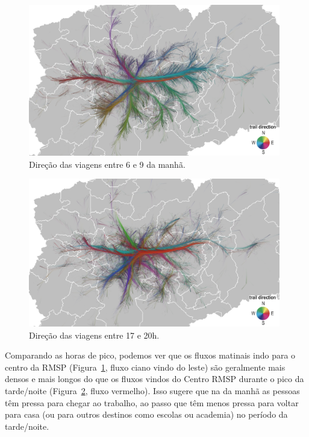 \begin{figure}[!htb]
  \centering
  \captionsetup{justification=centering}
  \includegraphics[width=0.98\textwidth]{../figuras/peak-hours-6h-to-9h-direction-leg.png}
  \caption{Direção das viagens entre 6 e 9 da manhã. \label{fig:peak-hours-6h-9h}}
\end{figure}
\vspace*{\floatsep}
\begin{figure}[!htb]
  \centering
  \captionsetup{justification=centering}
  \includegraphics[width=0.98\textwidth]{../figuras/peak-hours-17h-to-20h-direction-leg.png}
  \caption{Direção das viagens entre 17 e 20h. \label{fig:peak-hours-17h-20h}}
\end{figure}

Comparando as horas de pico, podemos ver que os fluxos matinais indo para o
centro da RMSP (Figura~\ref{fig:peak-hours-6h-9h}, fluxo ciano vindo do leste)
são geralmente mais densos e mais longos do que os fluxos vindos do Centro RMSP
durante o pico da tarde/noite (Figura~\ref{fig:peak-hours-17h-20h}, fluxo
vermelho). Isso sugere que na da manhã as pessoas têm pressa para chegar ao
trabalho, ao passo que têm menos pressa para voltar para casa (ou para outros
destinos como escolas ou academia) no período da tarde/noite.

